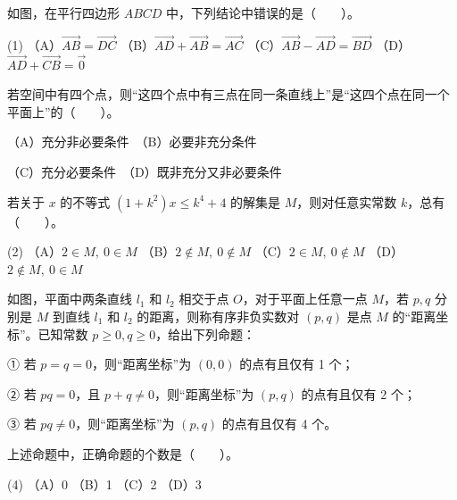 \Needspace{0.4\textheight}
\begin{question}
如图，在平行四边形 $ABCD$ 中，下列结论中错误的是\mbox{（　　）}。

\begin{gkopts}(1)
\task （A）$\overrightarrow{AB}=\overrightarrow{DC}$
\task （B）$\overrightarrow{AD}+\overrightarrow{AB}=\overrightarrow{AC}$
\task （C）$\overrightarrow{AB}-\overrightarrow{AD}=\overrightarrow{BD}$
\task （D）$\overrightarrow{AD}+\overrightarrow{CB}=\vec 0$
\end{gkopts}
\nopagebreak[4]
\begin{center}\end{center}
\nopagebreak[4]
\end{question}
\begin{question}
若空间中有四个点，则“这四个点中有三点在同一条直线上”是“这四个点在同一个平面上”的\mbox{（　　）}。

（A）充分非必要条件　（B）必要非充分条件

（C）充分必要条件　（D）既非充分又非必要条件

\end{question}
\begin{question}
若关于 $x$ 的不等式 $(1+k^2)x\le k^4+4$ 的解集是 $M$，则对任意实常数 $k$，总有\mbox{（　　）}。

\begin{gkopts}(2)
\task （A）$2\in M,\ 0\in M$
\task （B）$2\notin M,\ 0\notin M$
\task （C）$2\in M,\ 0\notin M$
\task （D）$2\notin M,\ 0\in M$
\end{gkopts}

\Needspace{0.4\textheight}
\end{question}
\begin{question}
如图，平面中两条直线 $l_1$ 和 $l_2$ 相交于点 $O$，对于平面上任意一点 $M$，若 $p,q$ 分别是 $M$ 到直线 $l_1$ 和 $l_2$ 的距离，则称有序非负实数对 $(p,q)$ 是点 $M$ 的“距离坐标”。已知常数 $p\ge0,q\ge0$，给出下列命题：

① 若 $p=q=0$，则“距离坐标”为 $(0,0)$ 的点有且仅有 1 个；

② 若 $pq=0$，且 $p+q\ne0$，则“距离坐标”为 $(p,q)$ 的点有且仅有 2 个；

③ 若 $pq\ne0$，则“距离坐标”为 $(p,q)$ 的点有且仅有 4 个。

上述命题中，正确命题的个数是\mbox{（　　）}。

\begin{gkopts}(4)
\task （A）0
\task （B）1
\task （C）2
\task （D）3
\end{gkopts}
\nopagebreak[4]
\begin{center}\end{center}
\nopagebreak[4]
\end{question}

